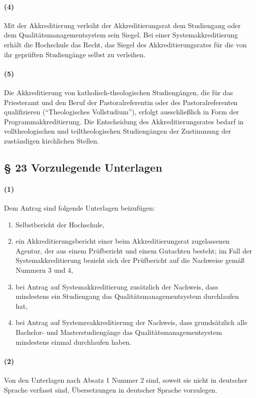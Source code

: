\documentclass[a4paper]{scrartcl}
\begin{document}
\paragraph{(4)} Mit der Akkreditierung verleiht der Akkreditierungsrat dem Studiengang oder dem Qualitätsmanagementsystem sein Siegel. Bei einer Systemakkreditierung erhält die Hochschule das Recht, das Siegel des Akkreditierungsrates für die von ihr geprüften Studiengänge selbst zu verleihen.
\paragraph{(5)} Die Akkreditierung von katholisch-theologischen Studiengängen, die für das Priesteramt und den Beruf der Pastoralreferentin oder des Pastoralreferenten qualifizieren (\enquote{Theologisches Vollstudium}), erfolgt ausschließlich in Form der Programmakkreditierung. Die Entscheidung des Akkreditierungsrates bedarf in volltheologischen und teiltheologischen Studiengängen der Zustimmung der zuständigen kirchlichen Stellen.
\subsection{§ 23 Vorzulegende Unterlagen}
\paragraph{(1)} Dem Antrag sind folgende Unterlagen beizufügen:
\begin{enumerate}
\item Selbstbericht der Hochschule,
\item ein Akkreditierungsbericht einer beim Akkreditierungsrat zugelassenen Agentur, der aus einem Prüfbericht und einem Gutachten besteht; im Fall der Systemakkreditierung bezieht sich der Prüfbericht auf die Nachweise gemäß Nummern 3 und 4,
\item bei Antrag auf Systemakkreditierung zusätzlich der Nachweis, dass mindestens ein Studiengang das Qualitätsmanagementsystem
durchlaufen hat,
\item bei Antrag auf Systemreakkreditierung der Nachweis, dass grundsätzlich alle Bachelor- und Masterstudiengänge das Qualitätsmanagementsystem mindestens einmal durchlaufen haben.
\end{enumerate}
\paragraph{(2)} Von den Unterlagen nach Absatz 1 Nummer 2 sind, soweit sie nicht in deutscher Sprache verfasst sind, Übersetzungen in deutscher Sprache vorzulegen.
\end{document}
